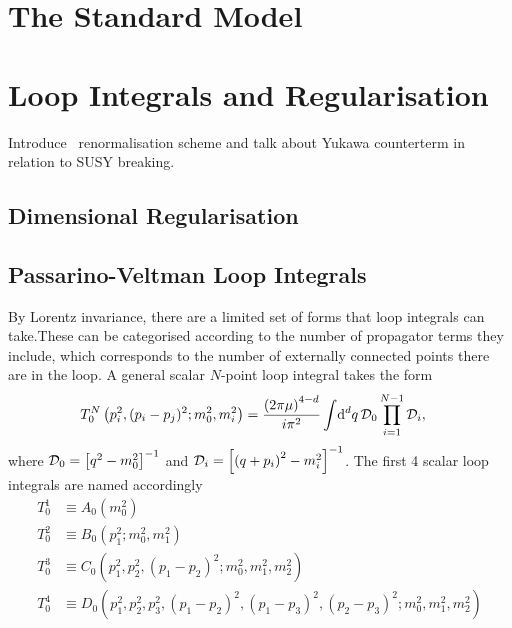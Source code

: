 \documentclass[../main.tex]{subfiles}
\begin{document}
\begin{donotread}
  \section{The Standard Model}

  \section{Loop Integrals and Regularisation}
  \begin{TODO}
    \item Introduce \DRbar\ renormalisation scheme and talk about Yukawa counterterm in relation to SUSY breaking.
  \end{TODO}

  \subsection{Dimensional Regularisation}

  \subsection{Passarino-Veltman Loop Integrals}
  By Lorentz invariance, there are a limited set of forms that loop integrals
  can
  take. These can be categorised according to the number
  of propagator terms they include, which corresponds to the number of externally
  connected points there are in the loop. A general scalar \(N\)-point loop
  integral takes the form
  \begin{align}
    T^N_0\left(p_i^2, (p_i-p_j)^2; m_0^2, m_i^2\right) & = \frac{\left(2\pi
        \mu\right)^{4-d}}{i \pi^2} \int \!\mathrm{d}^d q\, \mathcal{D}_0
    \prod_{i=1}^{N-1}
    \mathcal{D}_i,
  \end{align}
  where \(\mathcal{D}_0 = \left[q^2-m_0^2\right]^{-1}\) and \(\mathcal{D}_i =
  \left[\left(q+p_i\right)^2-m_i^2\right]^{-1}\).
  The first 4 scalar loop integrals are named accordingly
  \begin{align}
    T^1_0 & \equiv A_0(m_0^2)
    \\
    T^2_0 & \equiv B_0(p_1^2; m_0^2, m_1^2)
    \\
    T^3_0 & \equiv C_0(p_1^2, p_2^2, (p_1-p_2)^2; m_0^2, m_1^2, m_2^2)
    \\
    T^4_0 & \equiv D_0(p_1^2, p_2^2, p_3^2, (p_1-p_2)^2, (p_1-p_3)^2,
    (p_2-p_3)^2; m_0^2, m_1^2, m_2^2)
  \end{align}


\end{donotread}
\end{document}
